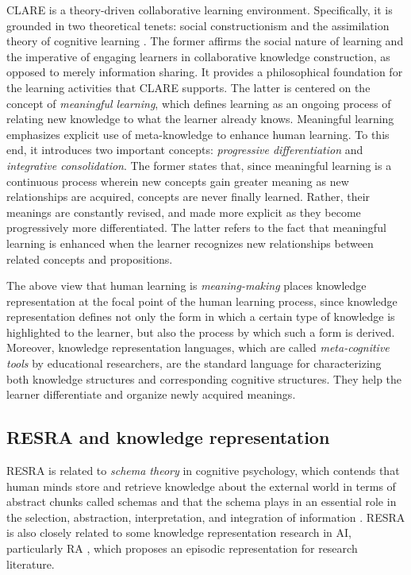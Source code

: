 CLARE is a theory-driven collaborative learning environment. Specifically,
it is grounded in two theoretical tenets: social constructionism
\cite{Berger66,Knorr-Cetina81} and the assimilation theory of cognitive
learning \cite{Ausubel63,Novak84}. The former affirms the social nature of
learning and the imperative of engaging learners in collaborative knowledge
construction, as opposed to merely information sharing. It provides a
philosophical foundation for the learning activities that CLARE
supports. The latter is centered on the concept of {\it meaningful
learning\/}, which defines learning as an ongoing process of relating new
knowledge to what the learner already knows. Meaningful learning emphasizes
explicit use of meta-knowledge to enhance human learning. To this end, it
introduces two important concepts: {\it progressive differentiation\/} and
{\it integrative consolidation\/}. The former states that, since meaningful
learning is a continuous process wherein new concepts gain greater meaning
as new relationships are acquired, concepts are never finally
learned. Rather, their meanings are constantly revised, and made more
explicit as they become progressively more differentiated.  The latter
refers to the fact that meaningful learning is enhanced when the learner
recognizes new relationships between related concepts and propositions.

The above view that human learning is {\it meaning-making} places knowledge
representation at the focal point of the human learning process, since
knowledge representation defines not only the form in which a certain type
of knowledge is highlighted to the learner, but also the process by which
such a form is derived. Moreover, knowledge representation languages, which
are called {\it meta-cognitive tools\/} by educational researchers, are the
standard language for characterizing both knowledge structures and
corresponding cognitive structures. They help the learner differentiate and
organize newly acquired meanings.


\subsection{RESRA and knowledge representation}

RESRA is related to {\it schema theory\/} in cognitive psychology, which
contends that human minds store and retrieve knowledge about the external
world in terms of abstract chunks called schemas \cite{Stillings87} and
that the schema plays in an essential role in the selection, abstraction,
interpretation, and integration of information \cite{Alba83}. RESRA is also
closely related to some knowledge representation research in AI,
particularly RA \cite{Swaminathan90}, which proposes an episodic
representation for research literature.

